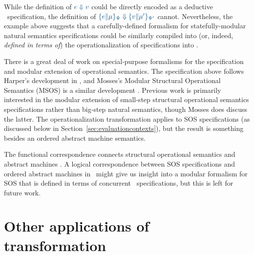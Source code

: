 While the definition of $\obj{e \Downarrow v}$ could be directly encoded
as a deductive \sls~specification, the definition of
$\obj{\{ e \| \mu \}_{\Psi} \Downarrow \{ v \| \mu' \}_{\Psi'}}$ cannot.
Nevertheless, the example above suggests
that a carefully-defined formalism for statefully-modular natural
semantics specifications could be similarly compiled into (or, indeed,
{\it defined in terms of}) the operationalization of specifications
into \sls.

There is a great deal of work on special-purpose formalisms for the 
specification and modular extension of operational semantics. 
The specification above follows Harper's development
in \cite{harper12practical}, and Mosses's Modular Structural
Operational Semantics (MSOS) is a similar development 
\cite{mosses04modular}. Previous work is primarily interested in the
modular extension of small-step structural operational semantics
specifications rather than big-step natural semantics, though Mosses
does discuss the latter. The operationalization transformation applies
to SOS specifications (as discussed below in
Section~\ref{sec:evaluationcontexts}), but the result is something
besides an ordered abstract machine semantics.

The functional correspondence connects structural operational
semantics and abstract machines \cite{danvy08defunctionalized}. A
logical correspondence between SOS specifications and ordered abstract
machines in \sls~might give us insight into a modular formalism for
SOS that is defined in terms of concurrent \sls~specifications, but
this is left for future work.


\section{Other applications of transformation}
\label{sec:othertransform}

